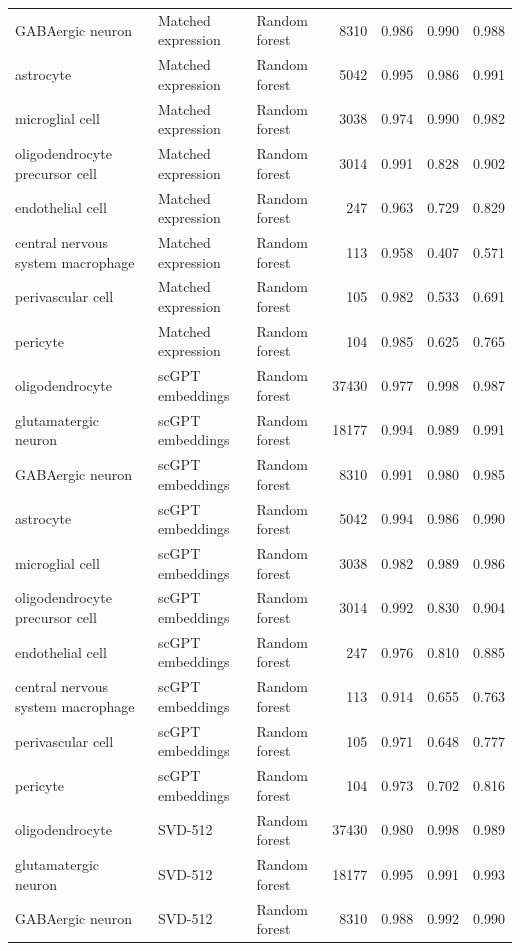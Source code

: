 {\begin{longtable}{>{\raggedright\arraybackslash}p{4.2cm}llrrrr}
GABAergic neuron & Matched expression & Random forest & 8310 & 0.986 & 0.990 & 0.988 \\
astrocyte & Matched expression & Random forest & 5042 & 0.995 & 0.986 & 0.991 \\
microglial cell & Matched expression & Random forest & 3038 & 0.974 & 0.990 & 0.982 \\
oligodendrocyte precursor cell & Matched expression & Random forest & 3014 & 0.991 & 0.828 & 0.902 \\
endothelial cell & Matched expression & Random forest & 247 & 0.963 & 0.729 & 0.829 \\
central nervous system macrophage & Matched expression & Random forest & 113 & 0.958 & 0.407 & 0.571 \\
perivascular cell & Matched expression & Random forest & 105 & 0.982 & 0.533 & 0.691 \\
pericyte & Matched expression & Random forest & 104 & 0.985 & 0.625 & 0.765 \\
oligodendrocyte & scGPT embeddings & Random forest & 37430 & 0.977 & 0.998 & 0.987 \\
glutamatergic neuron & scGPT embeddings & Random forest & 18177 & 0.994 & 0.989 & 0.991 \\
GABAergic neuron & scGPT embeddings & Random forest & 8310 & 0.991 & 0.980 & 0.985 \\
astrocyte & scGPT embeddings & Random forest & 5042 & 0.994 & 0.986 & 0.990 \\
microglial cell & scGPT embeddings & Random forest & 3038 & 0.982 & 0.989 & 0.986 \\
oligodendrocyte precursor cell & scGPT embeddings & Random forest & 3014 & 0.992 & 0.830 & 0.904 \\
endothelial cell & scGPT embeddings & Random forest & 247 & 0.976 & 0.810 & 0.885 \\
central nervous system macrophage & scGPT embeddings & Random forest & 113 & 0.914 & 0.655 & 0.763 \\
perivascular cell & scGPT embeddings & Random forest & 105 & 0.971 & 0.648 & 0.777 \\
pericyte & scGPT embeddings & Random forest & 104 & 0.973 & 0.702 & 0.816 \\
oligodendrocyte & SVD-512 & Random forest & 37430 & 0.980 & 0.998 & 0.989 \\
glutamatergic neuron & SVD-512 & Random forest & 18177 & 0.995 & 0.991 & 0.993 \\
GABAergic neuron & SVD-512 & Random forest & 8310 & 0.988 & 0.992 & 0.990 \\

\end{longtable}}
